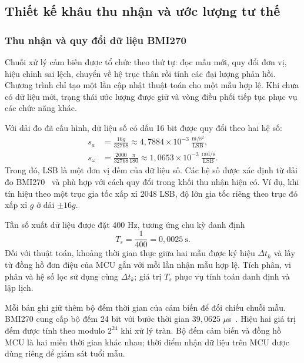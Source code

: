 \subsection{Thiết kế khâu thu nhận và ước lượng tư thế}
\label{sec:design-estimation}

\subsubsection{Thu nhận và quy đổi dữ liệu BMI270}

Chuỗi xử lý cảm biến được tổ chức theo thứ tự: đọc mẫu mới, quy đổi đơn vị, hiệu chỉnh sai lệch, chuyển về hệ trục thân rồi tính các đại lượng phản hồi. Chương trình chỉ tạo một lần cập nhật thuật toán cho một mẫu hợp lệ. Khi chưa có dữ liệu mới, trạng thái ước lượng được giữ và vòng điều phối tiếp tục phục vụ các chức năng khác.

Với dải đo đã cấu hình, dữ liệu số có dấu 16 bit được quy đổi theo hai hệ số:
\begin{equation}
	\begin{aligned}
		s_a      & =\frac{16g}{32768}
		\approx4{,}7884\times10^{-3}\
		\mathrm{\frac{m/s^2}{LSB}},                   \\
		s_\omega & =\frac{2000}{32768}\frac{\pi}{180}
		\approx1{,}0653\times10^{-3}\
		\mathrm{\frac{rad/s}{LSB}}.
	\end{aligned}
	\label{eq:design-imu-scales}
\end{equation}
Trong đó, LSB là một đơn vị đếm của dữ liệu số. Các hệ số được xác định từ dải đo BMI270~\cite{boschBmi270Datasheet} và phù hợp với cách quy đổi trong khối thu nhận hiện có. Ví dụ, khi tín hiệu theo một trục gia tốc xấp xỉ 2048 LSB, độ lớn gia tốc riêng theo trục đó xấp xỉ $g$ ở dải $\pm16g$.

Tần số xuất dữ liệu được đặt 400 Hz, tương ứng chu kỳ danh định
\begin{equation}
	T_s=\frac{1}{400}=0{,}0025\ \mathrm s.
	\label{eq:design-sampling-period}
\end{equation}
Đối với thuật toán, khoảng thời gian thực giữa hai mẫu được ký hiệu $\Delta t_k$ và lấy từ đồng hồ đơn điệu của MCU gắn với mỗi lần nhận mẫu hợp lệ. Tích phân, vi phân và hệ số lọc sử dụng cùng $\Delta t_k$; giá trị $T_s$ phục vụ tính toán danh định và lập lịch.

Mỗi bản ghi giữ thêm bộ đếm thời gian của cảm biến để đối chiếu chuỗi mẫu. BMI270 cung cấp bộ đếm 24 bit với bước thời gian $39{,}0625$ $\mu$s~\cite{boschBmi270Datasheet}. Hiệu hai giá trị đếm được tính theo modulo $2^{24}$ khi xử lý tràn. Bộ đếm cảm biến và đồng hồ MCU là hai miền thời gian khác nhau; thời điểm nhận dữ liệu trên MCU được dùng riêng để giám sát tuổi mẫu.


